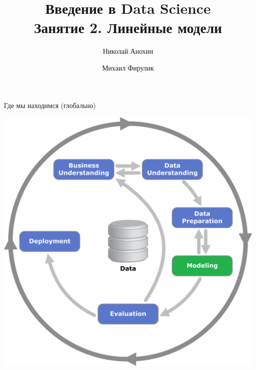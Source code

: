 \documentclass[10pt,a4paper]{beamer}
\author{Николай Анохин \and Михаил Фирулик}
\title{Введение в Data Science \\ Занятие 2. Линейные модели}
\begin{document}
\maketitle



\begin{frame}{Где мы находимся (глобально)}

\begin{center}
\includegraphics[scale=0.4]{images/crisp.png}
\end{center}

\end{frame}

\end{document}
